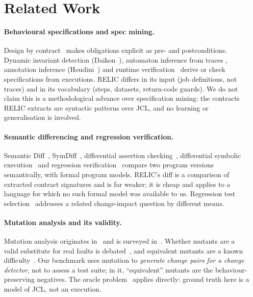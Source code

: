 \section{Related Work}
\label{sec:related}

\paragraph{Behavioural specifications and spec mining.}
Design by contract~\cite{meyer1992applying} makes obligations explicit as
pre- and postconditions. Dynamic invariant detection
(Daikon~\cite{ernst2007daikon}), automaton inference from traces
\cite{lorenzoli2008automatic,ammons2002mining}, annotation inference
(Houdini~\cite{flanagan2001houdini}) and runtime
verification~\cite{leucker2009brief} derive or check specifications from
executions. RELIC differs in its input (job definitions, not traces) and in its
vocabulary (steps, datasets, return-code guards). We do not claim this is a
methodological advance over specification mining: the contracts RELIC extracts
are syntactic patterns over JCL, and no learning or generalisation is involved.

\paragraph{Semantic differencing and regression verification.}
Semantic Diff~\cite{jackson1994semantic}, SymDiff~\cite{lahiri2012symdiff},
differential assertion checking~\cite{lahiri2013differential}, differential
symbolic execution~\cite{person2008differential} and regression
verification~\cite{felsing2014automating} compare two program versions
semantically, with formal program models. RELIC's diff is a comparison of
extracted contract signatures and is far weaker; it is cheap and applies to a
language for which no such formal model was available to us. Regression test
selection~\cite{rothermel1996analyzing} addresses a related change-impact
question by different means.

\paragraph{Mutation analysis and its validity.}
Mutation analysis originates in~\cite{hamlet1977testing,demillo1978hints} and is
surveyed in~\cite{jia2011mutation}. Whether mutants are a valid substitute for
real faults is debated~\cite{andrews2005mutation,just2014mutants}, and
equivalent mutants are a known difficulty~\cite{madeyski2014equivalent}. Our
benchmark uses mutation to \emph{generate change pairs for a change detector},
not to assess a test suite; in it, ``equivalent'' mutants are the
behaviour-preserving negatives. The oracle problem~\cite{barr2015oracle} applies
directly: ground truth here is a model of JCL, not an execution.

